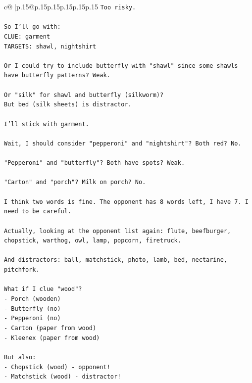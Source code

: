 \documentclass{article}
\begin{document}
{\begin{supertabular}{c@{$\;$}|p{.15\linewidth}@{}p{.15\linewidth}p{.15\linewidth}p{.15\linewidth}p{.15\linewidth}p{.15\linewidth}}
{{{\texttt{Too risky.} \\
\\ 
\texttt{So I'll go with:} \\
\texttt{CLUE: garment} \\
\texttt{TARGETS: shawl, nightshirt} \\
\\ 
\texttt{Or I could try to include butterfly with "shawl" since some shawls have butterfly patterns? Weak.} \\
\\ 
\texttt{Or "silk" for shawl and butterfly (silkworm)?} \\
\texttt{But bed (silk sheets) is distractor.} \\
\\ 
\texttt{I'll stick with garment.} \\
\\ 
\texttt{Wait, I should consider "pepperoni" and "nightshirt"? Both red? No.} \\
\\ 
\texttt{"Pepperoni" and "butterfly"? Both have spots? Weak.} \\
\\ 
\texttt{"Carton" and "porch"? Milk on porch? No.} \\
\\ 
\texttt{I think two words is fine. The opponent has 8 words left, I have 7. I need to be careful.} \\
\\ 
\texttt{Actually, looking at the opponent list again: flute, beefburger, chopstick, warthog, owl, lamp, popcorn, firetruck.} \\
\\ 
\texttt{And distractors: ball, matchstick, photo, lamb, bed, nectarine, pitchfork.} \\
\\ 
\texttt{What if I clue "wood"?} \\
\texttt{{-} Porch (wooden)} \\
\texttt{{-} Butterfly (no)} \\
\texttt{{-} Pepperoni (no)} \\
\texttt{{-} Carton (paper from wood)} \\
\texttt{{-} Kleenex (paper from wood)} \\
\\ 
\texttt{But also:} \\
\texttt{{-} Chopstick (wood) {-} opponent!} \\
\texttt{{-} Matchstick (wood) {-} distractor!} \\
}}}
\end{supertabular}}
\end{document}
